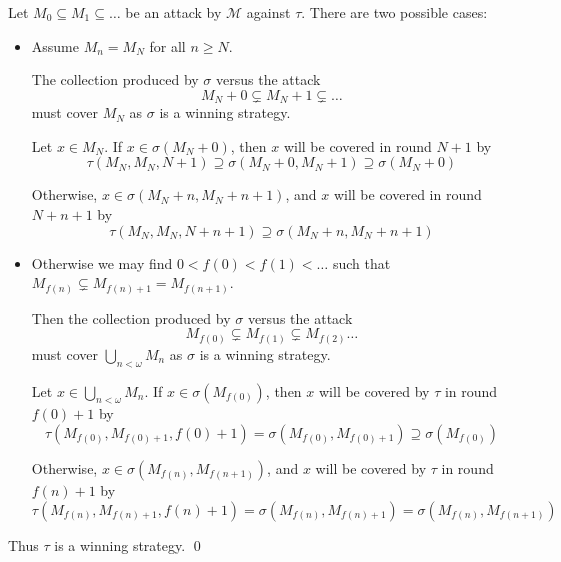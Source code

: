 \documentclass{beamer}
\theoremstyle{theorem}
\theoremstyle{definition}
\newcommand{\<}{\langle}
\renewcommand{\>}{\rangle}
\newcommand{\pl}[1]{\mathscr{#1}}
\begin{document}
\begin{frame}
Let $M_0 \subseteq M_1 \subseteq \dots$ be an attack by $\pl M$ against $\tau$. There are two possible cases:

      \begin{itemize}\small
        \item
          Assume $M_n=M_N$ for all $n\geq N$.\pause

          The collection produced by $\sigma$ versus the attack
            \[
              M_N+0 \subsetneq M_N+1 \subsetneq \dots
            \] 
          must cover $M_N$ as $\sigma$ is a winning strategy.\pause

          Let $x \in M_N$. If $x\in\sigma(M_N+0)$, then $x$ will be covered in round $N+1$ by 
            \[
              \tau(M_N,M_N,N+1)
              \supseteq \sigma(M_N+0,M_N+1)
              \supseteq \sigma(M_N+0)
            \]\pause

          Otherwise, $x\in\sigma(M_N+n,M_N+n+1)$, and $x$ will be covered in round $N+n+1$ by 
            \[
              \tau(M_N,M_N,N+n+1)
              \supseteq \sigma(M_N+n,M_N+n+1)
            \]
      \end{itemize}
\end{frame}
\begin{frame}
      \begin{itemize}\small
        \item
          Otherwise we may find $0<f(0)<f(1)<\dots$ such that $M_{f(n)}\subsetneq M_{f(n)+1}=M_{f(n+1)}$.\pause

          Then the collection produced by $\sigma$ versus the attack 
            \[
              M_{f(0)}\subsetneq M_{f(1)} \subsetneq M_{f(2)} \dots
            \]
          must cover $\bigcup_{n<\omega}M_n$ as $\sigma$ is a winning strategy.\pause

          Let $x \in \bigcup_{n<\omega}M_n$. If $x\in\sigma(M_{f(0)})$, then $x$ will be covered by $\tau$ in round $f(0)+1$ by
            \[
              \tau(M_{f(0)},M_{f(0)+1},f(0)+1)
              = \sigma(M_{f(0)},M_{f(0)+1})
              \supseteq \sigma(M_{f(0)})
            \]\pause

          Otherwise, $x\in\sigma(M_{f(n)},M_{f(n+1)})$, and $x$ will be covered by $\tau$ in round $f(n)+1$ by
            \[
              \tau(M_{f(n)},M_{f(n)+1},f(n)+1)
              = \sigma(M_{f(n)},M_{f(n)+1})
              = \sigma(M_{f(n)},M_{f(n+1)})
            \]
      \end{itemize}\pause

      Thus $\tau$ is a winning strategy. \qed
\end{frame}
\end{document}

